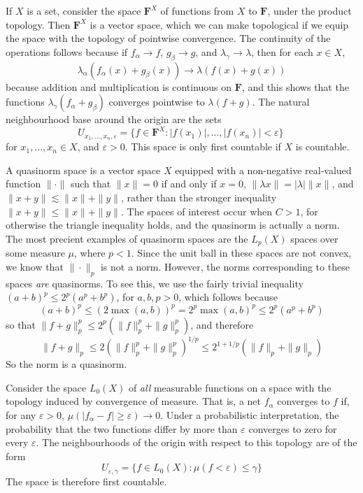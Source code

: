 \begin{example}
    If $X$ is a set, consider the space $\mathbf{F}^X$ of functions from $X$ to $\mathbf{F}$, under the product topology. Then $\mathbf{F}^X$ is a vector space, which we can make topological if we equip the space with the topology of pointwise convergence. The continuity of the operations follows because if $f_\alpha \to f$, $g_\beta \to g$, and $\lambda_\gamma \to \lambda$, then for each $x \in X$,
    \[ \lambda_\alpha (f_\alpha(x) + g_\beta(x)) \to \lambda( f(x) + g(x)) \]
    because addition and multiplication is continuous on $\mathbf{F}$, and this shows that the functions $\lambda_\gamma (f_\alpha + g_\beta)$ converges pointwise to $\lambda(f + g)$. The natural neighbourhood base around the origin are the sets
    \[ U_{x_1, \dots, x_n, \varepsilon} = \{ f \in \mathbf{F}^X : |f(x_1)|, \dots, |f(x_n)| < \varepsilon \}\ \]
    for $x_1, \dots, x_n \in X$, and $\varepsilon > 0$. This space is only first countable if $X$ is countable.
\end{example}

\begin{example}
    A quasinorm space is a vector space $X$ equipped with a non-negative real-valued function $\| \cdot \|$ such that $\| x \| = 0$ if and only if $x = 0$, $\| \lambda x \| = |\lambda| \| x \|$, and $\| x + y \| \lesssim \|x\| + \|y\|$, rather than the stronger inequality $\| x + y \| \leq \| x \| + \| y \|$. The spaces of interest occur when $C > 1$, for otherwise the triangle inequality holds, and the quasinorm is actually a norm. The most precient examples of quasinorm spaces are the $L_p(X)$ spaces over some measure $\mu$, where $p < 1$. Since the unit ball in these spaces are not convex, we know that $\| \cdot \|_p$ is not a norm. However, the norms corresponding to these spaces {\it are} quasinorms. To see this, we use the fairly trivial inequality $(a + b)^p \leq 2^p(a^p + b^p)$, for $a,b,p > 0$, which follows because
    \[ (a + b)^p \leq (2 \max(a,b))^p = 2^p \max(a,b)^p \leq 2^p(a^p + b^p) \]
    so that $\| f + g \|_p^p \leq 2^p ( \| f \|_p^p + \| g \|_p^p )$, and therefore
    \[ \| f + g \|_p \leq 2 ( \| f \|_p^p + \| g \|_p^p )^{1/p} \leq 2^{1 + 1/p} ( \| f \|_p + \| g \|_p ) \]
    So the norm is a quasinorm.
\end{example}

\begin{example}
    Consider the space $L_0(X)$ of {\it all} measurable functions on a space with the topology induced by convergence of measure. That is, a net $f_\alpha$ converges to $f$ if, for any $\varepsilon > 0$, $\mu ( |f_\alpha - f| \geq \varepsilon ) \to 0$. Under a probabilistic interpretation, the probability that the two functions differ by more than $\varepsilon$ converges to zero for every $\varepsilon$. The neighbourhoods of the origin with respect to this topology are of the form
    \[ U_{\varepsilon, \gamma} = \{ f \in L_0(X): \mu(f < \varepsilon) \leq \gamma \} \]
    The space is therefore first countable.
\end{example}

